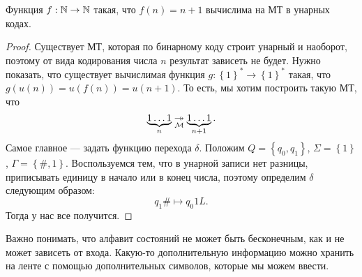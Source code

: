 \begin{statement}
    Функция $f: \mathbb{N} \to \mathbb{N}$ такая, что $f(n) = n + 1$ вычислима на МТ в унарных кодах.
\end{statement}

\begin{proof}
    Существует МТ, которая по бинарному коду строит унарный и наоборот, поэтому от вида кодирования числа $n$ результат зависеть не будет.
    Нужно показать, что существует вычислимая функция $g: \left\{1\right\}^{*} \to \left\{1\right\}^{*}$ такая, что $g(u(n)) = u(f(n)) = u(n + 1)$.
    То есть, мы хотим построить такую МТ, что
    $$
        \underbrace{1\ldots1}_{n} \underset{\mathcal{M}}{\twoheadrightarrow} \underbrace{1\ldots1}_{n + 1}.
    $$
    Самое главное --- задать функцию перехода $\delta$.
    Положим $Q = \left\{q_{0}, q_{1}\right\}$, $\Sigma = \left\{1\right\}$, $\Gamma = \left\{\#, 1\right\}$.
    Воспользуемся тем, что в унарной записи нет разницы, приписывать единицу в начало или в конец числа, поэтому определим $\delta$ следующим образом:
    $$
        q_{1}\# \mapsto q_{0}1L.
    $$
    Тогда у нас все получится.
\end{proof}

Важно понимать, что алфавит состояний не может быть бесконечным, как и не может зависеть от входа.
Какую-то дополнительную информацию можно хранить на ленте с помощью дополнительных символов, которые мы можем ввести.





